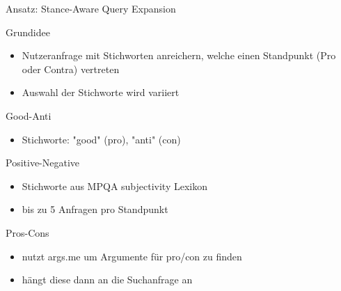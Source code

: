 \documentclass{beamer}
\begin{document}
	\begin{section}{Ansatz: Stance-Aware Query Expansion}
	\begin{frame}{Grundidee}
		\begin{itemize}
			\item Nutzeranfrage mit Stichworten anreichern, welche einen Standpunkt (Pro oder Contra) vertreten
			\item Auswahl der Stichworte wird variiert
		\end{itemize}
	\end{frame}

\begin{frame}{Good-Anti}
	\begin{itemize}
		\item Stichworte: "good" (pro), "anti" (con)
	\end{itemize}
\end{frame}
	
	\begin{frame}{Positive-Negative}
	\begin{itemize}
		\item Stichworte aus MPQA subjectivity Lexikon
		\item bis zu 5 Anfragen pro Standpunkt
	\end{itemize}
\end{frame}

	\begin{frame}{Pros-Cons}
	\begin{itemize}
		\item nutzt args.me um Argumente für pro/con zu finden
		\item hängt diese dann an die Suchanfrage an
	\end{itemize}
\end{frame}
\end{section}
	
\end{document}
